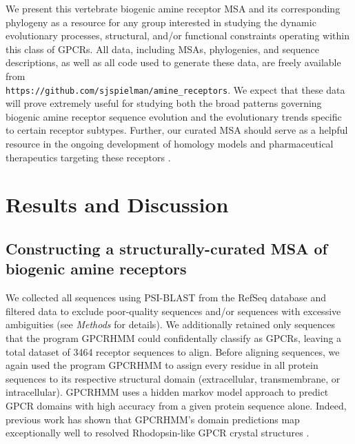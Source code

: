 \documentclass[fleqn,10pt]{wlpeerj}
\begin{document}
We present this vertebrate biogenic amine receptor MSA and its corresponding phylogeny as a resource for any group interested in studying the dynamic evolutionary processes, structural, and/or functional constraints operating within this class of GPCRs. All data, including MSAs, phylogenies, and sequence descriptions, as well as all code used to generate these data, are freely available from \\\texttt{https://github.com/sjspielman/amine\_receptors}. We expect that these data will prove extremely useful for studying both the broad patterns governing biogenic amine receptor sequence evolution and the evolutionary trends specific to certain receptor subtypes. Further, our curated MSA should serve as a helpful resource in the ongoing development of homology models and pharmaceutical therapeutics targeting these receptors \citep{Kristiansen2004,Ishiguro2004,Eversetal2005,Masonetal2012}.




\section*{Results and Discussion}

\subsection*{Constructing a structurally-curated MSA of biogenic amine receptors}

We collected all sequences using PSI-BLAST from the RefSeq  database \citep{refseq} and filtered data to exclude poor-quality sequences and/or sequences with excessive ambiguities (see \emph{Methods} for details). We additionally retained only sequences that the program GPCRHMM \citep{Wistrand2006} could confidentally classify as GPCRs, leaving a total dataset of 3464 receptor sequences to align. Before aligning sequences, we again used the program GPCRHMM \citep{Wistrand2006} to assign every residue in all protein sequences to its respective structural domain (extracellular, transmembrane, or intracellular). GPCRHMM uses a hidden markov model approach to predict GPCR domains with high accuracy from a given protein sequence alone. Indeed, previous work has shown that GPCRHMM's domain predictions map exceptionally well to resolved Rhodopsin-like GPCR crystal structures \citep{SpielmanWilke2013}. 
\end{document}
